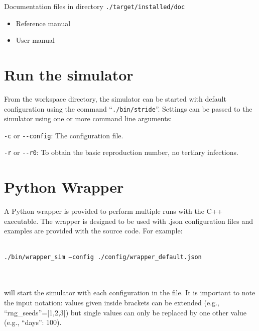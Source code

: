 \begin{compactitem}
\begin{itemize}
		
        \end{itemize}
    \item Documentation files
      	in directory \texttt{./target/installed/doc}
      	\begin{itemize}
        		\item Reference manual
        		\item User manual
        \end{itemize}
\end{compactitem}



\section{Run the simulator}


From the workspace directory, the simulator can be started with default configuration using the command \mbox{``\texttt{./bin/stride}''}. Settings can be passed to the simulator using one or more command line arguments:

\begin{compactitem}

\item \texttt{-c} or \texttt{{-}-config}: The configuration file.

\item \texttt{-r} or \texttt{{-}-r0}: To obtain the basic reproduction number, no tertiary infections.

\end{compactitem}

\section{Python Wrapper}
A Python wrapper is provided to perform multiple runs with the C++ executable. 
The wrapper is designed to be used with .json configuration files and examples are provided with the source code. 
For example: \\ \\
\centerline{\texttt{./bin/wrapper\_sim --config ./config/wrapper\_default.json}} \\ \\
will start the simulator with each configuration in the file.
It is important to note the input notation: values given inside brackets can be extended (e.g., ``rng\_seeds''=[1,2,3]) but single values can only be replaced by one other value (e.g., ``days'': 100).


